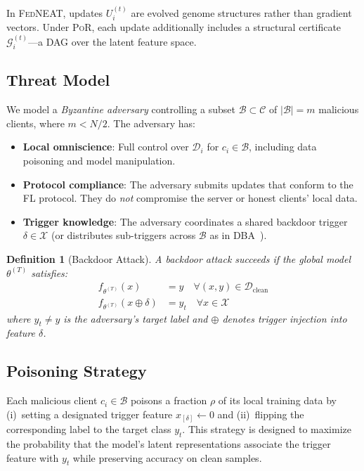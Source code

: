 \documentclass[journal]{IEEEtran}
\newtheorem{definition}{Definition}
\newcommand{\por}{\textsc{PoR}}
\newcommand{\fedneat}{\textsc{FedNEAT}}
\newcommand{\calB}{\mathcal{B}}
\newcommand{\calC}{\mathcal{C}}
\newcommand{\calD}{\mathcal{D}}
\newcommand{\calG}{\mathcal{G}}
\newcommand{\calX}{\mathcal{X}}
\begin{document}
In \fedneat{}, updates $U_i^{(t)}$ are evolved genome structures rather than
gradient vectors. Under \por{}, each update additionally includes a
structural certificate $\calG_i^{(t)}$---a DAG over the latent feature space.

\subsection{Threat Model}

We model a \textit{Byzantine adversary} controlling a subset
$\calB \subset \calC$ of $|\calB| = m$ malicious clients, where
$m < N/2$. The adversary has:

\begin{itemize}
  \item \textbf{Local omniscience}: Full control over $\calD_i$ for $c_i \in \calB$,
        including data poisoning and model manipulation.
  \item \textbf{Protocol compliance}: The adversary submits updates that
        conform to the FL protocol. They do \textit{not} compromise the server
        or honest clients' local data.
  \item \textbf{Trigger knowledge}: The adversary coordinates a shared
        backdoor trigger $\delta \in \calX$ (or distributes sub-triggers
        across $\calB$ as in DBA~\cite{xie2020dba}).
\end{itemize}

\begin{definition}[Backdoor Attack]
A backdoor attack succeeds if the global model $\theta^{(T)}$ satisfies:
\begin{align}
  f_{\theta^{(T)}}(x) &= y \quad \forall (x,y) \in \calD_{\text{clean}} \\
  f_{\theta^{(T)}}(x \oplus \delta) &= y_t \quad \forall x \in \calX
\end{align}
where $y_t \neq y$ is the adversary's target label and $\oplus$ denotes
trigger injection into feature $\delta$.
\end{definition}

\subsection{Poisoning Strategy}

Each malicious client $c_i \in \calB$ poisons a fraction $\rho$ of its
local training data by (i)~setting a designated trigger feature
$x_{[\delta]} \leftarrow 0$ and (ii)~flipping the corresponding label to the
target class $y_t$. This strategy is designed to maximize the probability
that the model's latent representations associate the trigger feature with
$y_t$ while preserving accuracy on clean samples.
\end{document}
